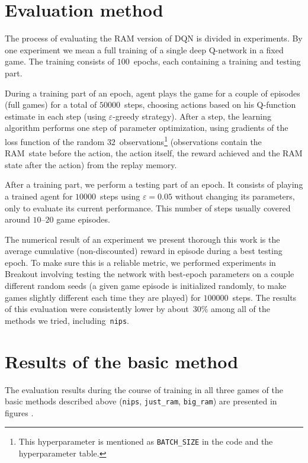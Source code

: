 \section{Evaluation method}
The process of evaluating the RAM version of DQN is divided in experiments. By one experiment we mean a full training of a single deep Q-network in a fixed game. The training consists of $100$~epochs, each containing a training and testing part.

During a training part of an epoch, agent plays the game for a couple of episodes (full games) for a total of $50000$~steps, choosing actions based on his Q-function estimate in each step (using $\varepsilon$-greedy strategy). After a step, the learning algorithm performs one step of parameter optimization, using gradients of the loss function of the random $32$~observations\footnote{This hyperparameter is mentioned as \texttt{BATCH\_SIZE} in the code and the hyperparameter table.} (observations contain the RAM~state before the action, the action itself, the reward achieved and the RAM state after the action) from the replay memory.

After a training part, we perform a testing part of an epoch. It consists of playing a trained agent for $10000$~steps using $\varepsilon=0.05$ without changing its parameters, only to evaluate its current performance. This number of steps usually covered around $10$--$20$ game episodes.

The numerical result of an experiment we present thorough this work is the average cumulative (non-discounted) reward in episode during a best testing epoch. To make sure this is a reliable metric, we performed experiments in Breakout involving testing the network with best-epoch parameters on a couple different random seeds (a given game episode is initialized randomly, to make games slightly different each time they are played) for $100000$~steps. The results of this evaluation were consistently lower by about~$30\%$ among all of the methods we tried, including~\texttt{nips}.

\section{Results of the basic method}
The evaluation results during the course of training in all three games of the basic methods described above (\texttt{nips}, \texttt{just\_ram}, \texttt{big\_ram}) are presented in figures .

